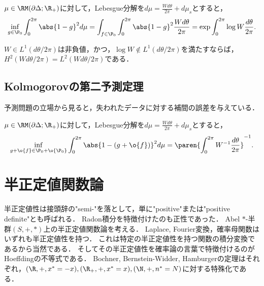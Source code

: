 \documentclass[uplatex,dvipdfmx]{jsreport}
\begin{document}
\begin{theorem}
    $\mu\in\RM(\partial\Delta;\R_+)$に対して，Lebesgue分解を$d\mu=\frac{Wd\theta}{2\pi}+d\mu_s$とすると，
    \[\inf_{g\in\P_0}\int^{2\pi}_0\abs{1-g}^2d\mu=\int_{f\in\P_0}\int^{2\pi}_0\abs{1-g}^2\frac{Wd\theta}{2\pi}=\exp\int^{2\pi}_0\log W\frac{d\theta}{2\pi}.\]
\end{theorem}

\begin{corollary}
    $W\in L^1(d\theta/2\pi)$は非負値，かつ，$\log W\notin L^1(d\theta/2\pi)$を満たすならば，$H^2(Wd\theta/2\pi)=L^2(Wd\theta/2\pi)$である．
\end{corollary}



\subsection{Kolmogorovの第二予測定理}

\begin{tcolorbox}[colframe=ForestGreen, colback=ForestGreen!10!white,breakable,colbacktitle=ForestGreen!40!white,coltitle=black,fonttitle=\bfseries\sffamily,
title=]
    予測問題の立場から見ると，失われたデータに対する補間の誤差を与えている．
\end{tcolorbox}

\begin{theorem}
    $\mu\in\RM(\partial\Delta;\R_+)$に対して，Lebesgue分解を$d\mu=\frac{Wd\theta}{2\pi}+d\mu_s$とすると，
    \[\inf_{g+\o{f}\in\P_0+\o{\P_0}}\int^{2\pi}_0\abs{1-(g+\o{f})}^2d\mu=\paren{\int^{2\pi}_0W^{-1}\frac{d\theta}{2\pi}}^{-1}.\]
\end{theorem}

\section{半正定値関数論}

\begin{tcolorbox}[colframe=ForestGreen, colback=ForestGreen!10!white,breakable,colbacktitle=ForestGreen!40!white,coltitle=black,fonttitle=\bfseries\sffamily,
title=]
    半正定値性は接頭辞の"semi-"を落として，単に"positive"または"positive definite"とも呼ばれる．
    Radon積分を特徴付けたのも正性であった．
    Abel $*$-半群$(S,+,*)$上の半正定値関数論を考える．
    Laplace, Fourier変換，確率母関数はいずれも半正定値性を持つ．
    これは特定の半正定値性を持つ関数の積分変換であるから当然である．
    そしてその半正定値性を確率論の言葉で特徴付けるのがHoeffdingの不等式である．
    Bochner, Bernstein-Widder, Hamburgerの定理はそれぞれ，$(\R,+,x^*=-x),(\R_+,+,x^*=x),(\N,+,n^*=N)$に対する特殊化である．
\end{tcolorbox}
\end{document}
